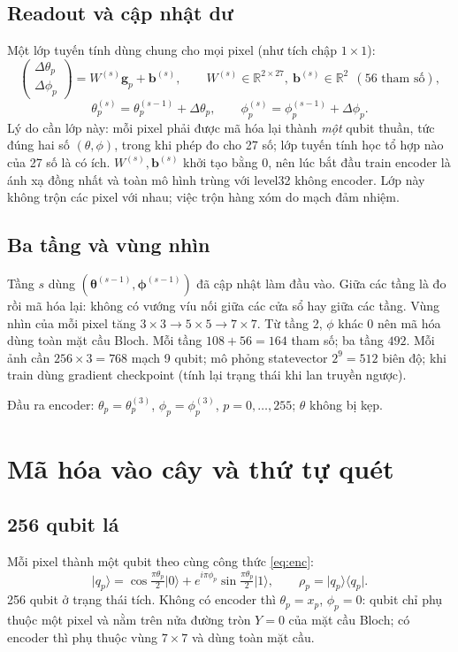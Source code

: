 \documentclass[11pt,a4paper]{article}
\newcommand{\ket}[1]{\lvert #1 \rangle}
\newcommand{\bra}[1]{\langle #1 \rvert}
\newcommand{\RR}{\mathbb{R}}
\begin{document}
\subsection{Readout và cập nhật dư}
Một lớp tuyến tính dùng chung cho mọi pixel (như tích chập $1\times1$):
\begin{equation}
\begin{pmatrix}\Delta\theta_p\\ \Delta\phi_p\end{pmatrix} = W^{(s)}\bm g_p + \bm b^{(s)},
\qquad W^{(s)}\in\RR^{2\times27},\ \bm b^{(s)}\in\RR^2\ \ (56 \text{ tham số}),
\end{equation}
\begin{equation}
\theta^{(s)}_p = \theta^{(s-1)}_p + \Delta\theta_p, \qquad \phi^{(s)}_p = \phi^{(s-1)}_p + \Delta\phi_p.
\end{equation}
Lý do cần lớp này: mỗi pixel phải được mã hóa lại thành \emph{một} qubit thuần, tức đúng hai số $(\theta,\phi)$,
trong khi phép đo cho 27 số; lớp tuyến tính học tổ hợp nào của 27 số là có ích.
$W^{(s)},\bm b^{(s)}$ khởi tạo bằng 0, nên lúc bắt đầu train encoder là ánh xạ đồng nhất và toàn mô hình trùng với
level32 không encoder. Lớp này không trộn các pixel với nhau; việc trộn hàng xóm do mạch đảm nhiệm.

\subsection{Ba tầng và vùng nhìn}
Tầng $s$ dùng $(\bm\theta^{(s-1)},\bm\phi^{(s-1)})$ đã cập nhật làm đầu vào. Giữa các tầng là đo rồi mã hóa lại:
không có vướng víu nối giữa các cửa sổ hay giữa các tầng. Vùng nhìn của mỗi pixel tăng
$3\times3 \to 5\times5 \to 7\times7$. Từ tầng 2, $\phi$ khác 0 nên mã hóa dùng toàn mặt cầu Bloch.
Mỗi tầng $108+56=164$ tham số; ba tầng $492$. Mỗi ảnh cần $256\times3=768$ mạch 9 qubit; mô phỏng statevector
$2^9=512$ biên độ; khi train dùng gradient checkpoint (tính lại trạng thái khi lan truyền ngược).

Đầu ra encoder: $\theta_p=\theta^{(3)}_p$, $\phi_p=\phi^{(3)}_p$, $p=0,\dots,255$; $\theta$ không bị kẹp.

\section{Mã hóa vào cây và thứ tự quét}

\subsection{256 qubit lá}
Mỗi pixel thành một qubit theo cùng công thức \eqref{eq:enc}:
\begin{equation}
\ket{q_p} = \cos\tfrac{\pi\theta_p}{2}\ket0 + e^{i\pi\phi_p}\sin\tfrac{\pi\theta_p}{2}\ket1,
\qquad \rho_p = \ket{q_p}\bra{q_p}.
\end{equation}
256 qubit ở trạng thái tích. Không có encoder thì $\theta_p=x_p$, $\phi_p=0$: qubit chỉ phụ thuộc một pixel và nằm
trên nửa đường tròn $Y=0$ của mặt cầu Bloch; có encoder thì phụ thuộc vùng $7\times7$ và dùng toàn mặt cầu.
\end{document}
